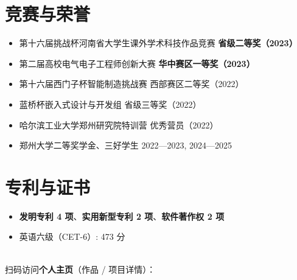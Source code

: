 \documentclass{resume-photo}
\newcommand{\hl}[1]{\textbf{\textcolor{hlred}{#1}}}
\begin{document}
\section{竞赛与荣誉}
\begin{itemize}
  \item 第十六届挑战杯河南省大学生课外学术科技作品竞赛 \hfill \hl{省级二等奖（2023）}
  \item 第二届高校电气电子工程师创新大赛 \hfill \hl{华中赛区一等奖（2023）}
  \item 第十六届西门子杯智能制造挑战赛 \hfill 西部赛区二等奖（2022）
  \item 蓝桥杯嵌入式设计与开发组 \hfill 省级三等奖（2022）
  \item 哈尔滨工业大学郑州研究院特训营 \hfill 优秀营员（2022）
  \item 郑州大学二等奖学金、三好学生 \hfill 2022—2023, 2024—2025
\end{itemize}

\section{专利与证书}
\begin{itemize}
  \item \hl{发明专利 4 项}、\hl{实用新型专利 2 项}、\hl{软件著作权 2 项}
  \item 英语六级（CET-6）: 473 分
\end{itemize}

\vfill
\begin{center}
  \\[4pt]
  {\footnotesize 扫码访问\hl{个人主页}（作品 / 项目详情）：}
\end{center}
\end{document}
